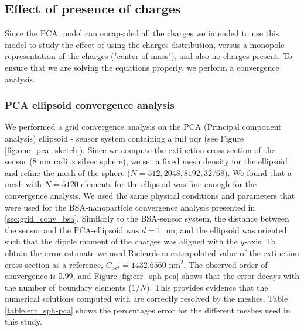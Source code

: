 \subsection{Effect of presence of charges}

Since the PCA model can encapsuled all the charges we intended to use this model to study the effect of using the charges distribution, versus
a monopole representation of the charges ("center of mass"), and also no charges present. To ensure that we are solving the equations properly, 
we perform a convergence analysis.


\subsubsection{PCA ellipsoid convergence analysis}

We performed a grid convergence analysis on the PCA (Principal component analysis) ellipsoid - sensor system containing a full pqr (see Figure \ref{fig:one_pca_sketch}). 
Since we compute the extinction cross section of the sensor (8 nm radius silver sphere), we set a fixed mesh density for the ellipsoid and refine 
the mesh of the sphere ($N=512, 2048, 8192, 32768$). We found that a mesh with $N=5120$ elements for the ellipsoid was fine enough for the convergence analysis.
We used the same physical conditions and parameters that were used for the BSA-nanoparticle convergence analysis presented in
\ref{sec:grid_conv_bsa}. Similarly to the BSA-sensor system, the distance between the sensor and the PCA-ellipsoid 
was $d=1$ nm, and the ellipsoid was oriented such that the dipole moment of the charges was aligned with the $y$-axis. To obtain the error 
estimate we used Richardson extrapolated value of the extinction cross section as a reference, $C_{ext} = 1432.6560$ nm$^2$.
The observed order of convergence is $0.99$, and Figure \ref{fig:err_sph-pca} shows that the error decays with the number of boundary elements ($1/N$). This provides
evidence that the numerical solutions computed with \pygbe are correctly resolved by the meshes.  Table \ref{table:err_sph-pca} shows the percentages error for the different 
meshes used in this study.

